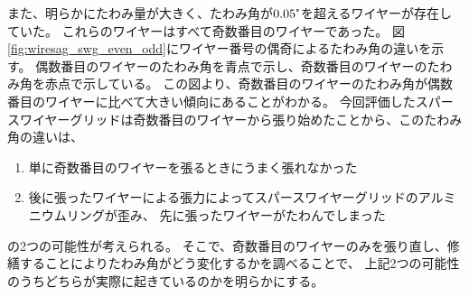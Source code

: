 \documentclass[../../main.tex]{subfiles}
\begin{document}
また、明らかにたわみ量が大きく、たわみ角が$0.05\tcdegree$を超えるワイヤーが存在していた。
これらのワイヤーはすべて奇数番目のワイヤーであった。
図\ref{fig:wiresag_swg_even_odd}にワイヤー番号の偶奇によるたわみ角の違いを示す。
偶数番目のワイヤーのたわみ角を青点で示し、奇数番目のワイヤーのたわみ角を赤点で示している。
この図より、奇数番目のワイヤーのたわみ角が偶数番目のワイヤーに比べて大きい傾向にあることがわかる。
今回評価したスパースワイヤーグリッドは奇数番目のワイヤーから張り始めたことから、このたわみ角の違いは、
\begin{enumerate}
    \item 単に奇数番目のワイヤーを張るときにうまく張れなかった
    \item 後に張ったワイヤーによる張力によってスパースワイヤーグリッドのアルミニウムリングが歪み、
          先に張ったワイヤーがたわんでしまった
\end{enumerate}
の2つの可能性が考えられる。
そこで、奇数番目のワイヤーのみを張り直し、修繕することによりたわみ角がどう変化するかを調べることで、
上記2つの可能性のうちどちらが実際に起きているのかを明らかにする。
\end{document}

